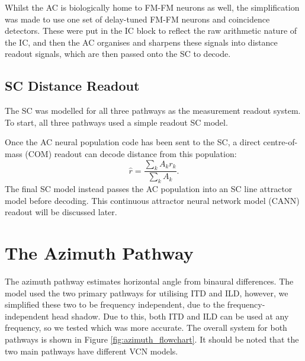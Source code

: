 Whilst the AC is biologically home to FM-FM neurons as well, the simplification was made to use one set of delay-tuned FM-FM neurons and coincidence detectors. These were put in the IC block to reflect the raw arithmetic nature of the IC, and then the AC organises and sharpens these signals into distance readout signals, which are then passed onto the SC to decode.

\subsection{SC Distance Readout}

The SC was modelled for all three pathways as the measurement readout system. To start, all three pathways used a simple readout SC model.

Once the AC neural population code has been sent to the SC, a direct centre-of-mass (COM) readout can decode distance from this population:
\begin{equation}
    \hat{r} = \frac{\sum_k A_k r_k}{\sum_k A_k}.
\end{equation}
The final SC model instead passes the AC population into an SC line attractor model before decoding. This continuous attractor neural network model (CANN) readout will be discussed later.

\section{The Azimuth Pathway}

The azimuth pathway estimates horizontal angle from binaural differences. The model used the two primary pathways for utilising ITD and ILD, however, we simplified these two to be frequency independent, due to the frequency-independent head shadow. Due to this, both ITD and ILD can be used at any frequency, so we tested which was more accurate. The overall system for both pathways is shown in Figure \ref{fig:azimuth_flowchart}. It should be noted that the two main pathways have different VCN models.


